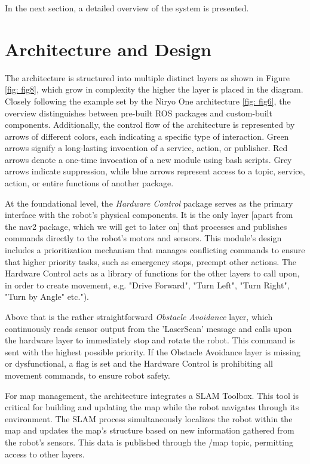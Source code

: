 \documentclass[%
paper=A4,               %
twoside=true,           %
openright,              %
11pt,                   %
bibliography=totoc,     %
titlepage=on,           %
DIV=12,                 %
BCOR=1.5cm,             %
parskip=half,            %
final
]{scrreprt}
\begin{document}
	 In the next section, a detailed overview of the system is presented. 
	 
	 
	 
	\section{Architecture and Design}
	
	The architecture is structured into multiple distinct layers as shown in Figure \ref{fig: fig8}, which grow in complexity the higher the layer is placed in the diagram. Closely following the example set by the Niryo One architecture \ref{fig: fig6}, the overview distinguishes between pre-built ROS packages and custom-built components. Additionally, the control flow of the architecture is represented by arrows of different colors, each indicating a specific type of interaction. Green arrows signify a long-lasting invocation of a service, action, or publisher. Red arrows denote a one-time invocation of a new module using bash scripts. Grey arrows indicate suppression, while blue arrows represent access to a topic, service, action, or entire functions of another package.
			
	At the foundational level, the \textit{Hardware Control} package serves as the primary interface with the robot's physical components. It is the only layer [apart from the nav2 package, which we will get to later on] that processes and publishes commands directly to the robot's motors and sensors. This module's design includes a prioritization mechanism that manages conflicting commands to ensure that higher priority tasks, such as emergency stops, preempt other actions. The Hardware Control acts as a library of functions for the other layers to call upon, in order to create movement, e.g. "Drive Forward", "Turn Left", "Turn Right", "Turn by Angle" etc."). 
		
	Above that is the rather straightforward \textit{Obstacle Avoidance} layer, which continuously reads sensor output from the 'LaserScan' message \autocite{ros.orgLaserScanMessage2024a} and calls upon the hardware layer to immediately stop and rotate the robot. This command is sent with the highest possible priority. If the Obstacle Avoidance layer is missing or dysfunctional, a flag is set and the Hardware Control is prohibiting all movement commands, to ensure robot safety. 
	
	For map management, the architecture integrates a SLAM Toolbox. This tool is critical for building and updating the map while the robot navigates through its environment. The SLAM process simultaneously localizes the robot within the map and updates the map's structure based on new information gathered from the robot's sensors. This data is published through the /map topic, permitting access to other layers.
	
\end{document}
